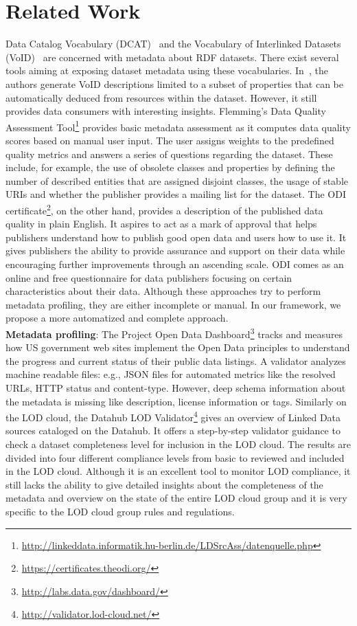 \section{Related Work}
\label{section:roomba-related-work}
Data Catalog Vocabulary (DCAT)~\cite{Erickson:DCV:14} and the Vocabulary of Interlinked Datasets (VoID)~\cite{Cyganiak:W3C:11} are concerned with metadata about RDF datasets. There exist several tools aiming at exposing dataset metadata using these vocabularies. In~\cite{Bohm:WebSemJournal:11}, the authors generate VoID descriptions limited to a subset of properties that can be automatically deduced from resources within the dataset. However, it still provides data consumers with interesting insights. Flemming's Data Quality Assessment Tool\footnote{\url{http://linkeddata.informatik.hu-berlin.de/LDSrcAss/datenquelle.php}} provides basic metadata assessment as it computes data quality scores based on manual user input. The user assigns weights to the predefined quality metrics and answers a series of questions regarding the dataset. These include, for example, the use of obsolete classes and properties by defining the number of described entities that are assigned disjoint classes, the usage of stable URIs and whether the publisher provides a mailing list for the dataset. The ODI certificate\footnote{\url{https://certificates.theodi.org/}}, on the other hand, provides a description of the published data quality in plain English. It aspires to act as a mark of approval that helps publishers understand how to publish good open data and users how to use it. It gives publishers the ability to provide assurance and support on their data while encouraging further improvements through an ascending scale. ODI comes as an online and free questionnaire for data publishers focusing on certain characteristics about their data. Although these approaches try to perform metadata profiling, they are either incomplete or manual. In our framework, we propose a more automatized and complete approach.\\

\textbf{Metadata profiling}: The Project Open Data Dashboard\footnote{\url{http://labs.data.gov/dashboard/}} tracks and measures how US government web sites implement the Open Data principles to understand the progress and current status of their public data listings. A validator analyzes machine readable files: e.g., JSON files for automated metrics like the resolved URLs, HTTP status and content-type. However, deep schema information about the metadata is missing like description, license information or tags. Similarly on the LOD cloud, the Datahub LOD Validator\footnote{\url{http://validator.lod-cloud.net/}} gives an overview of Linked Data sources cataloged on the Datahub. It offers a step-by-step validator guidance to check a dataset completeness level for inclusion in the LOD cloud. The results are divided into four different compliance levels from basic to reviewed and included in the LOD cloud. Although it is an excellent tool to monitor LOD compliance, it still lacks the ability to give detailed insights about the completeness of the metadata and overview on the state of the entire LOD cloud group and it is very specific to the LOD cloud group rules and regulations.\\

